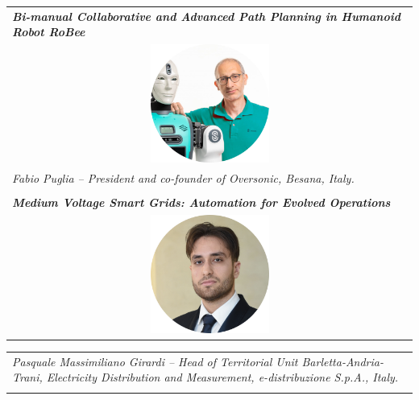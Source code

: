 \documentclass[
	openany, %
	parskip=full, %
	12pt, %
	a4paper, %
]{conferencebooklet} %
\begin{document}
\begin{multicols*}{2}
\begin{tabular}{p{75mm}}
            \textit{\textbf{Bi-manual Collaborative and Advanced Path Planning in Humanoid Robot RoBee}} \vspace{2mm} \\
            \multicolumn{1}{c}{ \includegraphics[width=0.3\textwidth]{industrial-panel/fabio-puglia.png}} \vspace{2mm} \\
            \textit{Fabio Puglia -- President and co-founder of Oversonic, Besana, Italy.}
            \\ \\

            \textit{\textbf{Medium Voltage Smart Grids: Automation for Evolved Operations}} \vspace{2mm} \\
            \multicolumn{1}{c}{ \includegraphics[width=0.3\textwidth]{industrial-panel/girardi.png}}
        \end{tabular}
            
        \begin{tabular}{p{75mm}}
            \textit{Pasquale Massimiliano Girardi -- Head of Territorial Unit Barletta-Andria-Trani, Electricity Distribution and Measurement, e-distribuzione S.p.A., Italy.}
            \\ \\
            

\end{tabular}
\end{multicols*}
\end{document}
